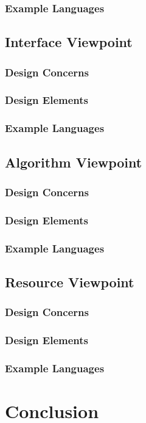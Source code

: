 \documentclass[onecolumn, draftclsnofoot,10pt, compsoc]{IEEEtran}
\begin{document}
\subsubsection{Example Languages}

\subsection{Interface Viewpoint}
\subsubsection{Design Concerns}

\subsubsection{Design Elements}

\subsubsection{Example Languages}

\subsection{Algorithm Viewpoint}
\subsubsection{Design Concerns}

\subsubsection{Design Elements}

\subsubsection{Example Languages}

\subsection{Resource Viewpoint}
\subsubsection{Design Concerns}

\subsubsection{Design Elements}

\subsubsection{Example Languages}

\section{Conclusion}
\end{document}
